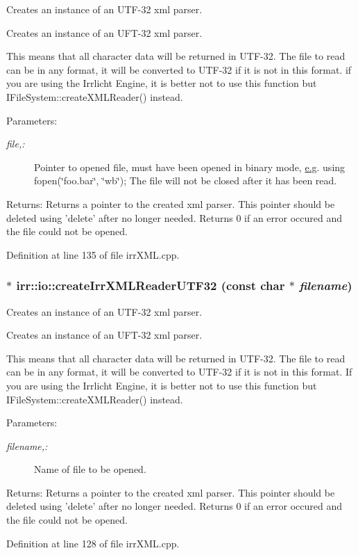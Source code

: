 Creates an instance of an UTF-32 xml parser. 

Creates an instance of an UFT-32 xml parser.

This means that all character data will be returned in UTF-32. The file to read can be in any format, it will be converted to UTF-32 if it is not in this format. if you are using the Irrlicht Engine, it is better not to use this function but IFileSystem::createXMLReader() instead. \begin{Desc}
\item[Parameters:]
\begin{description}
\item[{\em file,:}]Pointer to opened file, must have been opened in binary mode, \hyperlink{glext__bak_8h_caceb3a655ff28b75259860bcb868f9f}{e.g}. using fopen(\char`\"{}foo.bar\char`\"{}, \char`\"{}wb\char`\"{}); The file will not be closed after it has been read. \end{description}
\end{Desc}
\begin{Desc}
\item[Returns:]Returns a pointer to the created xml parser. This pointer should be deleted using 'delete' after no longer needed. Returns 0 if an error occured and the file could not be opened. \end{Desc}


Definition at line 135 of file irrXML.cpp.\hypertarget{namespaceirr_1_1io_42c53128ecf88af927030b6b9ea5afc2}{
\subsubsection[{createIrrXMLReaderUTF32}]{ $\ast$ irr::io::createIrrXMLReaderUTF32 (const char $\ast$ {\em filename})}}
\label{namespaceirr_1_1io_42c53128ecf88af927030b6b9ea5afc2}


Creates an instance of an UTF-32 xml parser. 

Creates an instance of an UFT-32 xml parser.

This means that all character data will be returned in UTF-32. The file to read can be in any format, it will be converted to UTF-32 if it is not in this format. If you are using the Irrlicht Engine, it is better not to use this function but IFileSystem::createXMLReader() instead. \begin{Desc}
\item[Parameters:]
\begin{description}
\item[{\em filename,:}]Name of file to be opened. \end{description}
\end{Desc}
\begin{Desc}
\item[Returns:]Returns a pointer to the created xml parser. This pointer should be deleted using 'delete' after no longer needed. Returns 0 if an error occured and the file could not be opened. \end{Desc}


Definition at line 128 of file irrXML.cpp.
